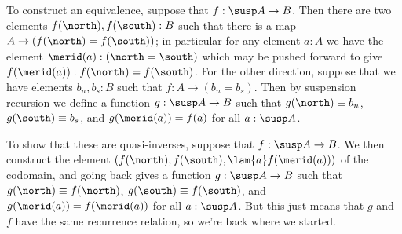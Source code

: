  \soln
To construct an equivalence, suppose that $f : \susp A \to B$.  Then there are
two elements $f(\north), f(\south) : B$ such that there is a map $A \to
(f(\north) = f(\south))$; in particular for any element $a : A$ we have the
element $\merid(a) : (\north = \south)$ which may be pushed forward to give
$f(\merid(a)) : f(\north) = f(\south)$.  For the other direction, suppose that
we have elements $b_{n}, b_{s} : B$ such that $f : A \to (b_{n} = b_{s})$.
Then by suspension recursion we define a function $g : \susp A \to B$ such that
$g(\north) \equiv b_{n}$, $g(\south) \equiv b_{s}$, and $g(\merid(a)) = f(a)$
for all $a : \susp A$.


To show that these are quasi-inverses, suppose that $f : \susp A \to B$.  We
then construct the element $(f(\north), f(\south), \lam{a}f(\merid(a)))$ of the
codomain, and going back gives a function $g : \susp A \to B$ such that
$g(\north) \equiv f(\north)$, $g(\south) \equiv f(\south)$, and $g(\merid(a)) =
f(\merid(a))$ for all $a : \susp A$.  But this just means that $g$ and $f$ have
the same recurrence relation, so we're back where we started.



